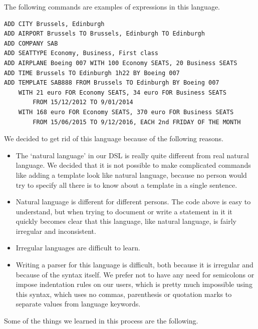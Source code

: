 The following commands are examples of expressions in this language.
\begin{lstlisting}[language=empty,frame=single]
ADD CITY Brussels, Edinburgh
ADD AIRPORT Brussels TO Brussels, Edinburgh TO Edinburgh
ADD COMPANY SAB
ADD SEATTYPE Economy, Business, First class
ADD AIRPLANE Boeing 007 WITH 100 Economy SEATS, 20 Business SEATS
ADD TIME Brussels TO Edinburgh 1h22 BY Boeing 007
ADD TEMPLATE SAB888 FROM Brussels TO Edinburgh BY Boeing 007
    WITH 21 euro FOR Economy SEATS, 34 euro FOR Business SEATS
        FROM 15/12/2012 TO 9/01/2014
    WITH 168 euro FOR Economy SEATS, 370 euro FOR Business SEATS
        FROM 15/06/2015 TO 9/12/2016, EACH 2nd FRIDAY OF THE MONTH
\end{lstlisting}

We decided to get rid of this language because of the following reasons.
\begin{itemize}
  \item The ‘natural language’ in our DSL is really quite different from real
    natural language. We decided that it is not possible to make complicated
    commands like adding a template look like natural language, because no
    person would try to specify all there is to know about a template in a
    single sentence.
  \item Natural language is different for different persons. The code above
    is easy to understand, but when trying to document or write a statement in
    it it quickly becomes clear that this language, like natural language, is
    fairly irregular and inconsistent.
  \item Irregular languages are difficult to learn.
  \item Writing a parser for this language is difficult, both because it is
    irregular and because of the syntax itself. We prefer not to have any need
    for semicolons or impose indentation rules on our users, which is pretty
    much impossible using this syntax, which uses no commas, parenthesis or
    quotation marks to separate values from language keywords.
\end{itemize}
Some of the things we learned in this process are the following.
